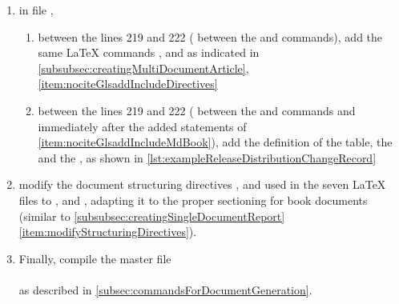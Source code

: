 \begin{enumerate}

\item in file ,
  \begin{enumerate}
  \item \label{item:nociteGlsaddIncludeMdBook} between the lines 219 and
    222 (\IE{} between the \latexcmd{\mainmatter} and \latexcmd{\appendix}
    commands), add the same \LaTeX{} commands \latexcmd{\nocite},
    \latexcmd{\glsadd} and \latexcmd{} as indicated in
    \autoref{subsubsec:creatingMultiDocumentArticle},
    \autoref{item:nociteGlsaddIncludeDirectives}

  \item between the lines 219 and 222 (\IE{} between the
    \latexcmd{\mainmatter} and \latexcmd{\appendix} commands and
    immediately after the added statements of
    \autoref{item:nociteGlsaddIncludeMdBook}), add the definition of the
     table, the  and the , as shown
    in \autoref{lst:exampleReleaseDistributionChangeRecord}
  \end{enumerate}

\item modify the document structuring directives \latexcmd{\section},
  \latexcmd{\subsection} and \latexcmd{\subsubsection} used in the seven
  \LaTeX{} files to \latexcmd{\chapter}, \latexcmd{\section} and
  \latexcmd{\subsection}, adapting it to the proper sectioning for book
  documents (similar to \autoref{subsubsec:creatingSingleDocumentReport}
  \autoref{item:modifyStructuringDirectives}).

\item Finally, compile the master file \\
   \\
  as described in \autoref{subsec:commandsForDocumentGeneration}.

\end{enumerate}
